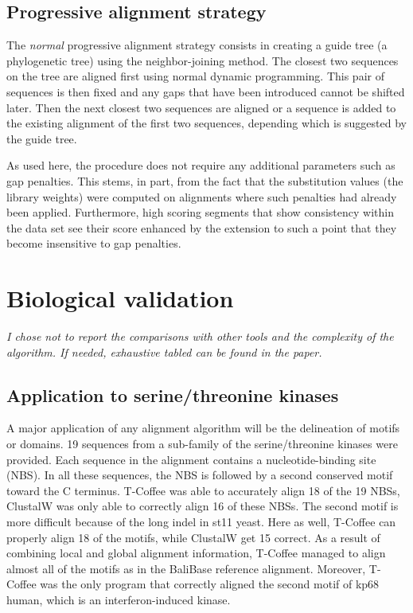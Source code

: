 \subsection{Progressive alignment strategy}
The \textit{normal} progressive alignment strategy consists in creating a guide tree (a phylogenetic tree) using the neighbor-joining method.
The closest two sequences on the tree are aligned first using normal dynamic programming.
This pair of sequences is then fixed and any gaps that have been introduced cannot be shifted later. Then the next closest two sequences are aligned or a sequence is added to the existing alignment of the first two sequences, depending which is suggested by the guide tree.

As used here, the procedure does not require any additional parameters such as gap penalties. This stems, in part, from the fact that the substitution values (the library weights) were computed on alignments where such penalties had already been applied. Furthermore, high scoring segments that show consistency within the data set see their score enhanced by the extension to such a point that they become insensitive to gap penalties.

\section{Biological validation}
\textit{I chose not to report the comparisons with other tools and the complexity of the algorithm. If needed, exhaustive tabled can be found in the paper.}

\subsection{Application to serine/threonine kinases}
A major application of any alignment algorithm will be the delineation of motifs or domains.
19 sequences from a sub-family of the serine/threonine kinases were provided. Each sequence in the alignment contains a nucleotide-binding site (NBS).
In all these sequences, the NBS is followed by a second conserved motif toward the C terminus.
T-Coffee was able to accurately align 18 of the 19 NBSs, ClustalW was only able to correctly align 16 of these NBSs. The second motif is more difficult
because of the long indel in st11 yeast. Here as well, T-Coffee can properly align 18 of the motifs, while ClustalW get 15 correct.
As a result of combining local and global alignment information, T-Coffee managed to align almost all of the motifs as in the BaliBase reference alignment. Moreover, T-Coffee was the only program that correctly aligned the second motif of kp68 human, which is an interferon-induced kinase.
